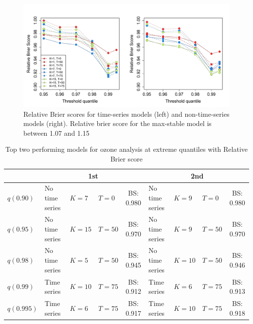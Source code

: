 \documentclass[11pt]{article}
\begin{document}
\begin{figure}
  \includegraphics[width=\linewidth]{plots/bs-ozone.pdf}
  \caption{Relative Brier scores for time-series models (left) and non-time-series models (right). Relative brier score for the max-stable model is between 1.07 and 1.15}
  \label{fig:bs-ozone}
\end{figure}
\begin{table}
  \small
  \caption{Top two performing models for ozone analysis at extreme quantiles with Relative Brier score}
  \label{tbl:ozoneresults}
  \centering
  \begin{tabular}{|l|l l l c|l l l c|}
    \cline{2-9}
    \multicolumn{1}{c|}{}  & \multicolumn{4}{c|}{1st} & \multicolumn{4}{c|}{2nd} \\
    \hline
    $q(0.90)$  & No time series & $K=7$  & $T=0$  & BS: 0.980 &
                 No time series & $K=9$  & $T=0$  & BS: 0.980 \\
    $q(0.95)$  & No time series & $K=15$ & $T=50$ & BS: 0.970 &
                 No time series & $K=9$  & $T=50$ & BS: 0.970\\
    $q(0.98)$  & No time series & $K=5$  & $T=50$ & BS: 0.945 &
                 No time series & $K=10$ & $T=50$ & BS: 0.946\\
    $q(0.99)$  & Time series    & $K=10$ & $T=75$ & BS: 0.912 &
                 Time series    & $K=6$  & $T=75$ & BS: 0.913\\
    $q(0.995)$ & Time series    & $K=6$  & $T=75$ & BS: 0.917 &
                 Time series    & $K=10$ & $T=75$ & BS: 0.918\\
    \hline
  \end{tabular}
\end{table}
\end{document}
